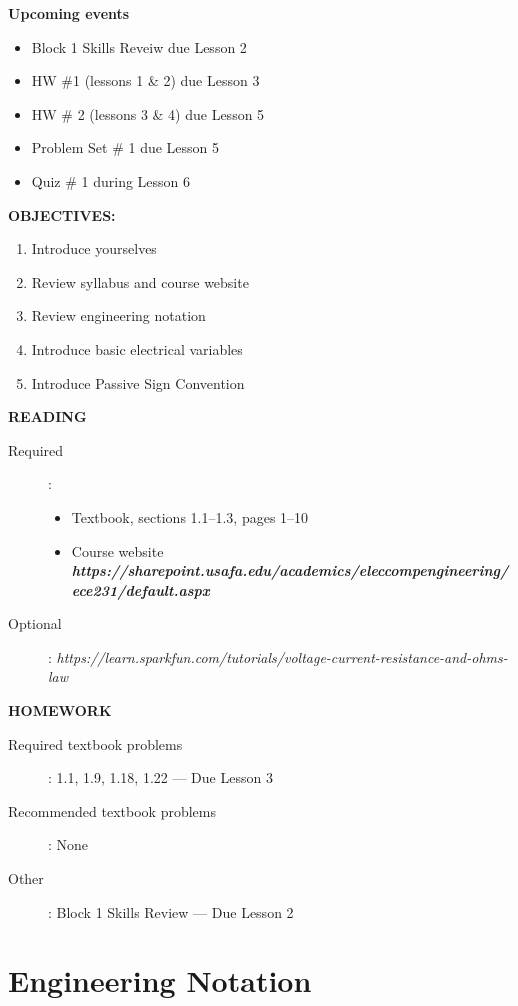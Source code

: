 \documentclass{handout}
\begin{document}
\maketitle

\textbf{Upcoming events}
\begin{itemize}
\item Block 1 Skills Reveiw due Lesson 2
\item HW \#1 (lessons 1 \& 2) due Lesson 3
\item HW \# 2 (lessons 3 \& 4) due Lesson 5
\item Problem Set \# 1 due Lesson 5
\item Quiz \# 1 during Lesson 6
\end{itemize}

\textbf{OBJECTIVES:}
\begin{enumerate}
\item Introduce yourselves
\item Review syllabus and course website
\item Review engineering notation
\item Introduce basic electrical variables
\item Introduce Passive Sign Convention
\end{enumerate}

\textbf{READING}
\begin{description}
\item [Required]:
\begin{itemize}
\item  Textbook, sections 1.1--1.3, pages 1--10
\item Course website \em{\textbf{https://sharepoint.usafa.edu/academics/eleccompengineering/ece231/default.aspx}}\em
\end{itemize}
\item [Optional]: {\em https://learn.sparkfun.com/tutorials/voltage-current-resistance-and-ohms-law}
\end{description}

\textbf{HOMEWORK}
\begin{description}
\item [Required textbook problems]: 1.1, 1.9, 1.18, 1.22 --- Due Lesson 3
\item [Recommended textbook problems]: None
\item[Other]: Block 1 Skills Review --- Due Lesson 2
\end{description}


\section{Engineering Notation}
\end{document}
